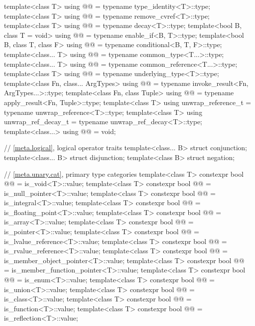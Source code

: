 \begin{codeblock}
{  template<class T>
    using @@    = typename type_identity<T>::type;
  template<class T>
    using @@     = typename remove_cvref<T>::type;
  template<class T>
    using @@            = typename decay<T>::type;
  template<bool B, class T = void>
    using @@        = typename enable_if<B, T>::type;
  template<bool B, class T, class F>
    using @@      = typename conditional<B, T, F>::type;
  template<class... T>
    using @@      = typename common_type<T...>::type;
  template<class... T>
    using @@ = typename common_reference<T...>::type;
  template<class T>
    using @@  = typename underlying_type<T>::type;
  template<class Fn, class... ArgTypes>
    using @@    = typename invoke_result<Fn, ArgTypes...>::type;
  template<class Fn, class Tuple>
    using @@     = typename apply_result<Fn, Tuple>::type;
  template<class T>
    using unwrap_reference_t = typename unwrap_reference<T>::type;
  template<class T>
    using unwrap_ref_decay_t = typename unwrap_ref_decay<T>::type;
  template<class...>
    using @@             = void;

  // \ref{meta.logical}, logical operator traits
  template<class... B> struct conjunction;
  template<class... B> struct disjunction;
  template<class B> struct negation;

  // \ref{meta.unary.cat}, primary type categories
  template<class T>
    constexpr bool @@ = is_void<T>::value;
  template<class T>
    constexpr bool @@ = is_null_pointer<T>::value;
  template<class T>
    constexpr bool @@ = is_integral<T>::value;
  template<class T>
    constexpr bool @@ = is_floating_point<T>::value;
  template<class T>
    constexpr bool @@ = is_array<T>::value;
  template<class T>
    constexpr bool @@ = is_pointer<T>::value;
  template<class T>
    constexpr bool @@ = is_lvalue_reference<T>::value;
  template<class T>
    constexpr bool @@ = is_rvalue_reference<T>::value;
  template<class T>
    constexpr bool @@ = is_member_object_pointer<T>::value;
  template<class T>
    constexpr bool @@ = is_member_function_pointer<T>::value;
  template<class T>
    constexpr bool @@ = is_enum<T>::value;
  template<class T>
    constexpr bool @@ = is_union<T>::value;
  template<class T>
    constexpr bool @@ = is_class<T>::value;
  template<class T>
    constexpr bool @@ = is_function<T>::value;
  template<class T>
    constexpr bool @@ = is_reflection<T>::value;

}
\end{codeblock}

